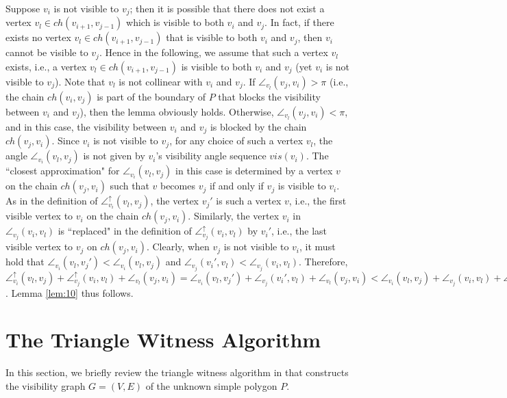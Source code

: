 \documentclass[11pt]{article}
\def\sangle{\angle^{\uparrow}}
\def\sectionspace{\vspace*{0in}}
\begin{document}
Suppose $v_i$ is not visible to $v_j$; then it is possible that there does not
exist a vertex $v_l\in ch(v_{i+1},v_{j-1})$ which is visible
to both $v_i$ and $v_j$. In fact, if there 
exists no vertex $v_l\in ch(v_{i+1},v_{j-1})$ that is visible
to both $v_i$ and $v_j$, then $v_i$ cannot be visible to $v_j$. Hence in
the following, we assume that such a vertex $v_l$ exists, i.e., a
vertex $v_l\in
ch(v_{i+1},v_{j-1})$ is visible to both $v_i$ and $v_j$ (yet $v_i$ is not visible to $v_j$).
Note that $v_l$ is not collinear with $v_i$ and $v_j$.
If $\angle_{v_l}(v_j,v_i)>\pi$ (i.e., the chain $ch(v_{i},v_{j})$ is part of the
boundary of $P$ that blocks
the visibility between $v_i$ and $v_j$), then the lemma obviously holds.  Otherwise,
$\angle_{v_l}(v_j,v_i)<\pi$, and in this case,
the visibility between $v_i$ and $v_j$ is blocked
by the chain $ch(v_{j},v_{i})$.
Since $v_i$ is not visible to $v_j$, for any choice of such a vertex $v_l$, 
the angle $\angle_{v_i}(v_l,v_j)$
is not given by $v_i$'s visibility angle sequence $vis(v_i)$. 
The ``closest approximation" for $\angle_{v_i}(v_l,v_j)$ in this case is determined by
a vertex $v$ on the chain $ch(v_{j},v_{i})$ such that $v$ becomes $v_j$ if and
only if $v_j$ is visible to $v_i$.
As in the definition of
$\sangle_{v_i}(v_l,v_j)$, the vertex $v_j'$ is such a vertex $v$, i.e., the
first visible vertex to $v_i$ on the chain $ch(v_j,v_i)$.
Similarly, the
vertex $v_i$ in $\angle_{v_j}(v_i,v_l)$ is ``replaced" in the definition
of $\sangle_{v_j}(v_i,v_l)$ by $v_i'$, i.e.,
the last visible vertex to $v_j$ on $ch(v_j,v_i)$.
Clearly, when $v_j$ is not visible to $v_i$, it must hold that 
$\angle_{v_i}(v_l,v_j')<\angle_{v_i}(v_l,v_j)$ and
$\angle_{v_j}(v_i',v_l)<\angle_{v_j}(v_i,v_l)$. Therefore,  
$\sangle_{v_i}(v_l,v_j)+\sangle_{v_j}(v_i,v_l)+\angle_{v_l}(v_j,v_i)=
\angle_{v_i}(v_l,v_j')+\angle_{v_j}(v_i',v_l)+\angle_{v_l}(v_j,v_i)
<\angle_{v_i}(v_l,v_j)+\angle_{v_j}(v_i,v_l)+\angle_{v_l}(v_j,v_i)=\pi$.
Lemma \ref{lem:10} thus follows. 

\sectionspace
\section{The Triangle Witness Algorithm}
\label{sec:review}
In this section, we briefly review the triangle witness algorithm in \cite{ref:DisserRe10} that
constructs the visibility graph $G=(V,E)$ of the unknown simple polygon $P$. 
\end{document}

